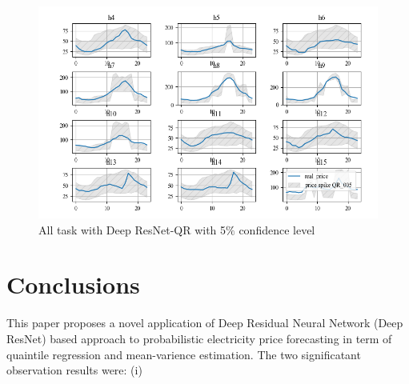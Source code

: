 \documentclass[review]{elsarticle}
\begin{document}
  \begin{figure}[H]
    \includegraphics[width=15cm]{All_task_with_spike_price_QR_005}
    \caption{All task with Deep ResNet-QR with 5$\%$ confidence level}
    \label{Fig:all_task_QR_005}
  \centering
  \end{figure}

\section{Conclusions}
  This paper proposes a novel application of Deep Residual Neural Network (Deep ResNet) based approach to probabilistic electricity price forecasting in term of quaintile regression and mean-varience estimation. The two significatant observation results were: (i)
\end{document}
